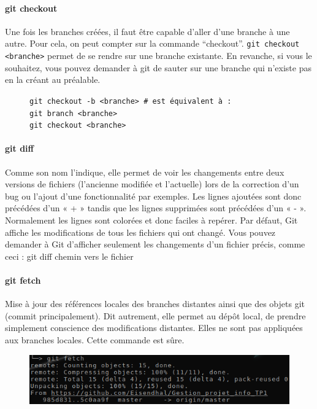 \documentclass[11pt,canadien]{article}
\begin{document}
\paragraph{git checkout}Une fois les branches créées, il faut être capable d'aller d'une branche à une autre. Pour cela, on peut compter sur la commande ``checkout''. \texttt{git checkout <branche>} permet de se rendre sur une branche existante. En revanche, si vous le souhaitez, vous pouvez demander à git de sauter sur une branche qui n'existe pas en la créant au préalable.
\begin{figure}[H]
	\texttt{git checkout -b <branche> \# est équivalent à : \\
		    git branch <branche> \\
			git checkout <branche>
	}
\end{figure}

\paragraph{git diff}Comme son nom l’indique, elle permet de voir les changements entre deux versions de fichiers (l’ancienne modifiée et l’actuelle) lors de la correction d’un bug ou l’ajout d’une fonctionnalité par exemples. Les lignes ajoutées sont donc précédées d’un « + » tandis que les lignes supprimées sont précédées d’un « - ». Normalement les lignes sont colorées et donc faciles à repérer. Par défaut, Git affiche les modifications de tous les fichiers qui ont changé. Vous pouvez demander à Git d’afficher seulement les changements d’un fichier précis, comme ceci :
git diff chemin vers le fichier

\paragraph{git fetch}Mise à jour des références locales des branches distantes ainsi que des objets git (commit principalement). Dit autrement, elle permet au dépôt local, de prendre simplement conscience des modifications distantes. Elles ne sont pas appliquées aux branches locales. Cette commande est sûre.
\begin{figure}[H]
	\centering
	\includegraphics{images/git_fetch.png}
\end{figure}
\end{document}
